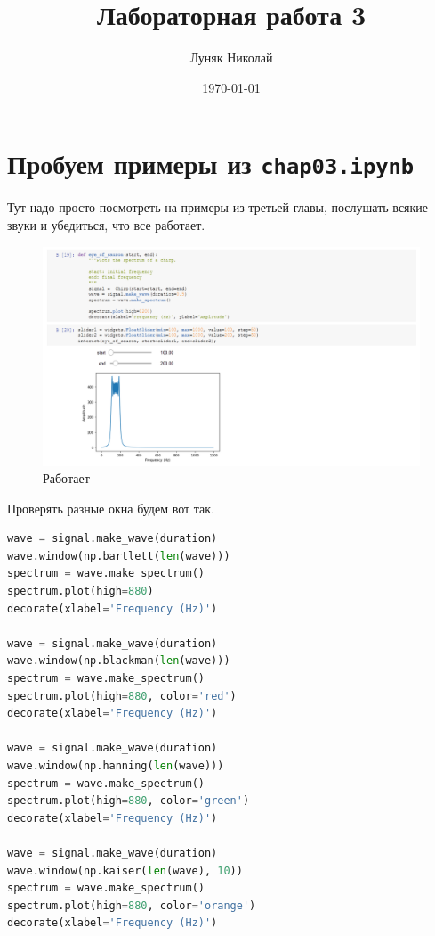 \documentclass[a4paper,12pt]{report}
\author{Луняк Николай}
\title{Лабораторная работа 3}
\date{\today}
\begin{document}
    \maketitle
    \tableofcontents
    \listoffigures
    \lstlistoflistings
    
    \chapter{Пробуем примеры из \texttt{chap03.ipynb}}
    
    Тут надо просто посмотреть на примеры из третьей главы, послушать всякие звуки и убедиться, что все работает.
    
    \begin{figure}[H]
        \centering
        \includegraphics[width=\textwidth]{ex1_it_works.png}
        \caption{Работает}
        \label{fig:ex1_it_works}
    \end{figure}
    
    Проверять разные окна будем вот так.
    
\begin{lstlisting}[language=Python,caption=Проверка окон]
wave = signal.make_wave(duration)
wave.window(np.bartlett(len(wave)))
spectrum = wave.make_spectrum()
spectrum.plot(high=880)
decorate(xlabel='Frequency (Hz)')

wave = signal.make_wave(duration)
wave.window(np.blackman(len(wave)))
spectrum = wave.make_spectrum()
spectrum.plot(high=880, color='red')
decorate(xlabel='Frequency (Hz)')

wave = signal.make_wave(duration)
wave.window(np.hanning(len(wave)))
spectrum = wave.make_spectrum()
spectrum.plot(high=880, color='green')
decorate(xlabel='Frequency (Hz)')

wave = signal.make_wave(duration)
wave.window(np.kaiser(len(wave), 10))
spectrum = wave.make_spectrum()
spectrum.plot(high=880, color='orange')
decorate(xlabel='Frequency (Hz)')
\end{lstlisting}
\end{document}

